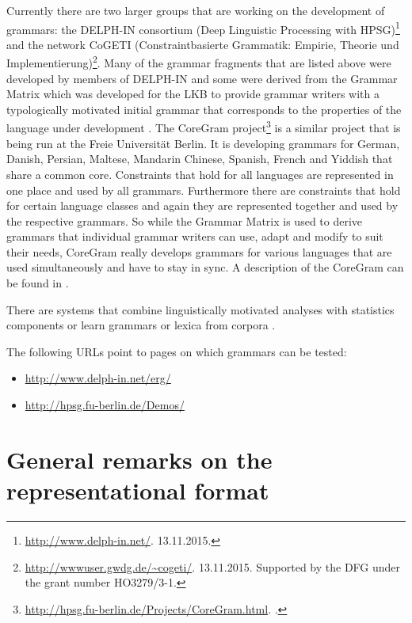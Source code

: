 Currently there are two larger groups that are working on the development of grammars: the DELPH-IN consortium (Deep Linguistic Processing with HPSG)\footnote{
  \url{http://www.delph-in.net/}. 13.11.2015.
} and the network CoGETI (Constraintbasierte Grammatik: Empirie, Theorie und Implementierung)\footnote{
\url{http://wwwuser.gwdg.de/~cogeti/}. 13.11.2015. Supported by the DFG under the grant number HO3279/3-1.%
}. 
Many of the grammar fragments that are listed above were developed by members of DELPH-IN and some
were derived from the Grammar Matrix which was developed for the LKB to provide
grammar writers with a typologically motivated initial grammar that corresponds to the properties of
the language under development \citep*{BFO2002a-u}. The CoreGram project\footnote{
\url{http://hpsg.fu-berlin.de/Projects/CoreGram.html}. \mytoday.
} is a similar project that is being run at the Freie Universität
Berlin. It is developing grammars for German, Danish,
Persian, Maltese, Mandarin Chinese,
Spanish, French and Yiddish that share a common core. Constraints
that hold for all languages are represented in one place and used by all grammars. Furthermore there are constraints that
hold for certain language classes and again they are represented together and used by the respective
grammars. So while the Grammar Matrix is used to derive grammars that individual grammar writers can use, adapt and modify to suit
their needs, CoreGram really develops grammars for various languages that are used simultaneously
and have to stay in sync. A description of the CoreGram can be found in .

There are systems that combine linguistically motivated analyses with statistics components
\citep{Brew95a,MNT2005a-u,MT2008a-u} or learn grammars or lexica from corpora \citep{Fouvry2003a-u,CZ2009a-u}. 

The following URLs point to pages on which grammars can be tested:
\begin{itemize}
\item \url{http://www.delph-in.net/erg/}
\item \url{http://hpsg.fu-berlin.de/Demos/}
\end{itemize}


\section{General remarks on the representational format}

